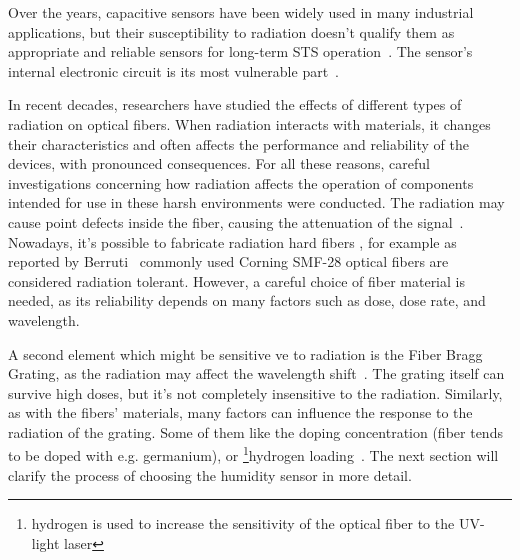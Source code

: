 Over the years, capacitive sensors have been widely used in many industrial applications, but their susceptibility to radiation doesn't qualify them as appropriate and reliable sensors for long-term \gls{STS} operation~\cite{Kapic, capacitive_irrad, Berruti}. The sensor's internal electronic circuit is its most vulnerable part~\cite{SHCHEMEROV20222871}.

In recent decades, researchers have studied the effects of different types of radiation on optical fibers. When radiation interacts with materials, it changes their characteristics and often affects the performance and reliability of the devices, with pronounced consequences. For all these reasons, careful investigations concerning how radiation affects the operation of components intended for use in these harsh environments were conducted. The radiation may cause point defects inside the fiber, causing the attenuation of the signal~\cite{FOS_FIB_RAD}. Nowadays, it's possible to fabricate radiation hard fibers \cite{troska}, for example as reported by Berruti~\cite{Berruti} commonly used Corning SMF-28 optical fibers are considered radiation tolerant. However, a careful choice of fiber material is needed, as its reliability depends on many factors such as dose, dose rate, and wavelength.  

A second element which might be sensitive ve to radiation is the  Fiber Bragg Grating, as the radiation may affect the wavelength shift~\cite{gusarov}. The grating itself can survive high doses, but it's not completely insensitive to the radiation. Similarly, as with the fibers' materials, many factors can influence the response to the radiation of the grating. Some of them like the doping concentration (fiber tends to be doped with e.g. germanium), or \footnote{hydrogen is used to increase the sensitivity of the optical fiber to the UV-light laser}{hydrogen loading}~\cite{gusarov}. The next section will clarify the process of choosing the humidity sensor in more detail. 


